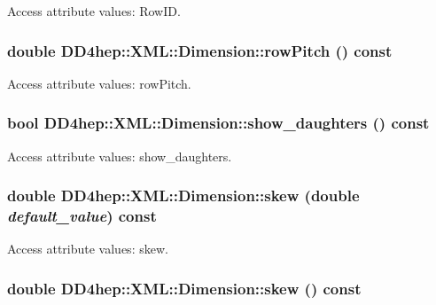 Access attribute values: RowID. \hypertarget{struct_d_d4hep_1_1_x_m_l_1_1_dimension_acb7a7b6142039a142d3cbe749b1d5a43}{
\subsubsection[{rowPitch}]{\setlength{\rightskip}{0pt plus 5cm}double DD4hep::XML::Dimension::rowPitch () const}}
\label{struct_d_d4hep_1_1_x_m_l_1_1_dimension_acb7a7b6142039a142d3cbe749b1d5a43}


Access attribute values: rowPitch. \hypertarget{struct_d_d4hep_1_1_x_m_l_1_1_dimension_a9acff89fd8ce3725565bd8e08d39ef55}{
\subsubsection[{show\_\-daughters}]{\setlength{\rightskip}{0pt plus 5cm}bool DD4hep::XML::Dimension::show\_\-daughters () const}}
\label{struct_d_d4hep_1_1_x_m_l_1_1_dimension_a9acff89fd8ce3725565bd8e08d39ef55}


Access attribute values: show\_\-daughters. \hypertarget{struct_d_d4hep_1_1_x_m_l_1_1_dimension_a8c265a0ee3443ee2a88612fc6f605fd1}{
\subsubsection[{skew}]{\setlength{\rightskip}{0pt plus 5cm}double DD4hep::XML::Dimension::skew (double {\em default\_\-value}) const}}
\label{struct_d_d4hep_1_1_x_m_l_1_1_dimension_a8c265a0ee3443ee2a88612fc6f605fd1}


Access attribute values: skew. \hypertarget{struct_d_d4hep_1_1_x_m_l_1_1_dimension_a15bcb5b0e6be5022ddce3af6e459409b}{
\subsubsection[{skew}]{\setlength{\rightskip}{0pt plus 5cm}double DD4hep::XML::Dimension::skew () const}}
\label{struct_d_d4hep_1_1_x_m_l_1_1_dimension_a15bcb5b0e6be5022ddce3af6e459409b}


